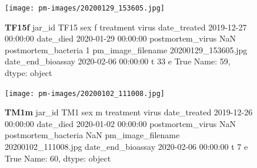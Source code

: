 \begin{figure}[h!]
\centering
\texttt{[image: pm-images/20200129\_153605.jpg]}
\caption{\textbf{TF15f} jar\_id                                TF15
sex                                      f
treatment                            virus
date\_treated           2019-12-27 00:00:00
date\_died              2020-01-29 00:00:00
postmortem\_virus                       NaN
postmortem\_bacteria                      1
pm\_image\_filename      20200129\_153605.jpg
date\_end\_bioassay      2020-02-06 00:00:00
t                                       33
e                                     True
Name: 59, dtype: object}
\end{figure}
\clearpage

\begin{figure}[h!]
\centering
\texttt{[image: pm-images/20200102\_111008.jpg]}
\caption{\textbf{TM1m} jar\_id                                 TM1
sex                                      m
treatment                            virus
date\_treated           2019-12-26 00:00:00
date\_died              2020-01-02 00:00:00
postmortem\_virus                       NaN
postmortem\_bacteria                    NaN
pm\_image\_filename      20200102\_111008.jpg
date\_end\_bioassay      2020-02-06 00:00:00
t                                        7
e                                     True
Name: 60, dtype: object}
\end{figure}
\clearpage

